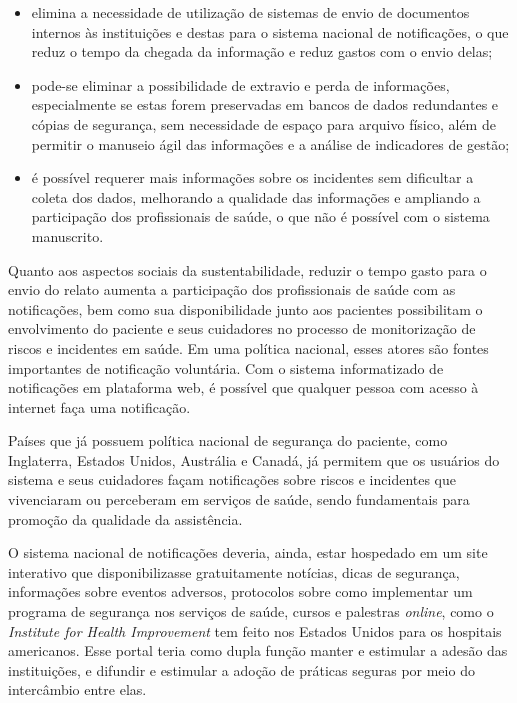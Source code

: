\documentclass{article}
\begin{document}
\begin{itemize}
\item
elimina a necessidade de utilização de sistemas de envio de documentos internos
às
instituições e destas para o sistema nacional de notificações, o que reduz o
tempo da
chegada da informação e reduz gastos com o envio delas;

\item
pode-se eliminar a possibilidade de extravio e perda de informações,
especialmente se
estas forem preservadas em bancos de dados redundantes e cópias de segurança,
sem
necessidade de espaço para arquivo físico, além de permitir o manuseio ágil das
informações e a análise de indicadores de gestão;

\item
é possível requerer mais informações sobre os incidentes sem dificultar a coleta
dos
dados, melhorando a qualidade das informações e ampliando a participação dos
profissionais de saúde, o que não é possível com o sistema manuscrito.

\end{itemize}

Quanto aos aspectos sociais da sustentabilidade, reduzir o tempo gasto para o
envio do
relato aumenta a participação dos profissionais de saúde com as notificações,
bem como sua
disponibilidade junto aos pacientes possibilitam o envolvimento do paciente e
seus
cuidadores no processo de monitorização de riscos e incidentes em saúde. Em uma
política
nacional, esses atores são fontes importantes de notificação voluntária. Com o
sistema
informatizado de notificações em plataforma web, é possível que qualquer pessoa
com acesso à
internet faça uma notificação.

Países que já possuem política nacional de segurança do paciente, como
Inglaterra, Estados
Unidos, Austrália e Canadá, já permitem que os usuários do sistema e seus
cuidadores façam
notificações sobre riscos e incidentes que vivenciaram ou perceberam em serviços
de saúde,
sendo fundamentais para promoção da qualidade da assistência.

O sistema nacional de notificações deveria, ainda, estar hospedado em um site
interativo
que disponibilizasse gratuitamente notícias, dicas de segurança, informações
sobre eventos
adversos, protocolos sobre como implementar um programa de segurança nos
serviços de saúde,
cursos e palestras \textit{online}, como o \textit{Institute for Health
Improvement}
tem feito nos Estados Unidos para os hospitais americanos. Esse
portal teria como dupla função manter e estimular a adesão das instituições, e
difundir e
estimular a adoção de práticas seguras por meio do intercâmbio entre elas.
\end{document}
